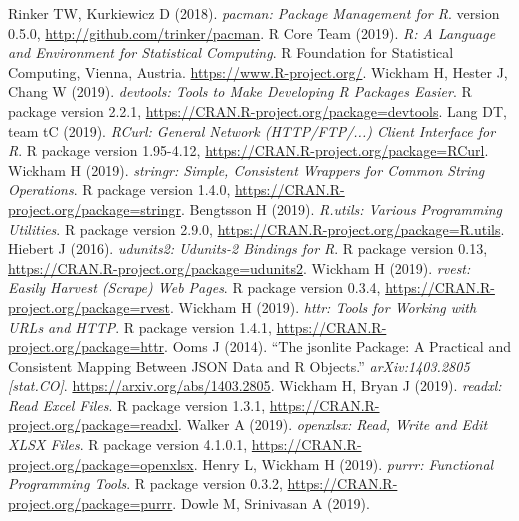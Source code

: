 \documentclass[journal,datadescriptor,accept,moreauthors,pdftex]{Definitions/mdpi}
\begin{document}
Rinker TW, Kurkiewicz D (2018).
\emph{pacman: Package Management for R}.
version 0.5.0, \url{http://github.com/trinker/pacman}.
\newline R Core Team (2019).
\emph{R: A Language and Environment for Statistical Computing}.
R Foundation for Statistical Computing, Vienna, Austria.
\url{https://www.R-project.org/}.
\newline Wickham H, Hester J, Chang W (2019).
\emph{devtools: Tools to Make Developing R Packages Easier}.
R package version 2.2.1, \url{https://CRAN.R-project.org/package=devtools}.
\newline Lang DT, team tC (2019).
\emph{RCurl: General Network (HTTP/FTP/...) Client Interface for R}.
R package version 1.95-4.12, \url{https://CRAN.R-project.org/package=RCurl}.
\newline Wickham H (2019).
\emph{stringr: Simple, Consistent Wrappers for Common String Operations}.
R package version 1.4.0, \url{https://CRAN.R-project.org/package=stringr}.
\newline Bengtsson H (2019).
\emph{R.utils: Various Programming Utilities}.
R package version 2.9.0, \url{https://CRAN.R-project.org/package=R.utils}.
\newline Hiebert J (2016).
\emph{udunits2: Udunits-2 Bindings for R}.
R package version 0.13, \url{https://CRAN.R-project.org/package=udunits2}.
\newline Wickham H (2019).
\emph{rvest: Easily Harvest (Scrape) Web Pages}.
R package version 0.3.4, \url{https://CRAN.R-project.org/package=rvest}.
\newline Wickham H (2019).
\emph{httr: Tools for Working with URLs and HTTP}.
R package version 1.4.1, \url{https://CRAN.R-project.org/package=httr}.
\newline Ooms J (2014).
``The jsonlite Package: A Practical and Consistent Mapping Between JSON Data and R Objects.''
\emph{arXiv:1403.2805 [stat.CO]}.
\url{https://arxiv.org/abs/1403.2805}.
\newline Wickham H, Bryan J (2019).
\emph{readxl: Read Excel Files}.
R package version 1.3.1, \url{https://CRAN.R-project.org/package=readxl}.
\newline Walker A (2019).
\emph{openxlsx: Read, Write and Edit XLSX Files}.
R package version 4.1.0.1, \url{https://CRAN.R-project.org/package=openxlsx}.
\newline Henry L, Wickham H (2019).
\emph{purrr: Functional Programming Tools}.
R package version 0.3.2, \url{https://CRAN.R-project.org/package=purrr}.
\newline Dowle M, Srinivasan A (2019).
\end{document}
